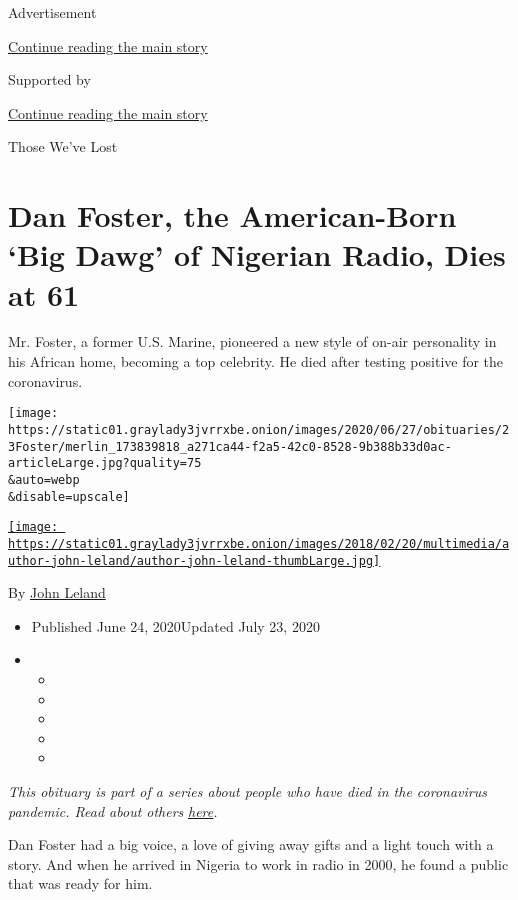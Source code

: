 Advertisement

\protect\hyperlink{after-top}{Continue reading the main story}

Supported by

\protect\hyperlink{after-sponsor}{Continue reading the main story}

Those We've Lost

\hypertarget{dan-foster-the-american-born-big-dawg-of-nigerian-radio-dies-at-61}{%
\section{Dan Foster, the American-Born `Big Dawg' of Nigerian Radio,
Dies at
61}\label{dan-foster-the-american-born-big-dawg-of-nigerian-radio-dies-at-61}}

Mr. Foster, a former U.S. Marine, pioneered a new style of on-air
personality in his African home, becoming a top celebrity. He died after
testing positive for the coronavirus.

\texttt{[image: https://static01.graylady3jvrrxbe.onion/images/2020/06/27/obituaries/23Foster/merlin\_173839818\_a271ca44-f2a5-42c0-8528-9b388b33d0ac-articleLarge.jpg?quality=75\\\&auto=webp\\\&disable=upscale]}

\href{https://www.nytimes3xbfgragh.onion/by/john-leland}{\texttt{[image: https://static01.graylady3jvrrxbe.onion/images/2018/02/20/multimedia/author-john-leland/author-john-leland-thumbLarge.jpg]}}

By \href{https://www.nytimes3xbfgragh.onion/by/john-leland}{John Leland}

\begin{itemize}
\item
  Published June 24, 2020Updated July 23, 2020
\item
  \begin{itemize}
  \item
  \item
  \item
  \item
  \item
  \end{itemize}
\end{itemize}

\emph{This obituary is part of a series about people who have died in
the coronavirus pandemic. Read about others}
\href{https://www.nytimes3xbfgragh.onion/interactive/2020/obituaries/people-died-coronavirus-obituaries.html}{\emph{here}}\emph{.}

Dan Foster had a big voice, a love of giving away gifts and a light
touch with a story. And when he arrived in Nigeria to work in radio in
2000, he found a public that was ready for him.

